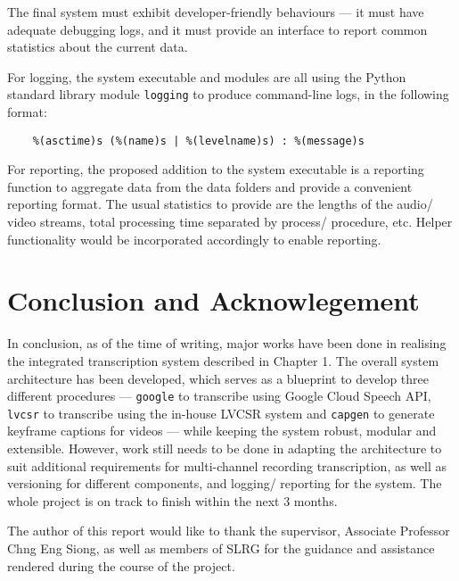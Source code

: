 The final system must exhibit developer-friendly behaviours --- it must have
adequate debugging logs, and it must provide an interface to report common
statistics about the current data.

For logging, the system executable and modules are all using the Python standard
library module \texttt{logging} to produce command-line logs, in the following
format:

\begin{lstlisting}
    %(asctime)s (%(name)s | %(levelname)s) : %(message)s
\end{lstlisting}

For reporting, the proposed addition to the system executable is a reporting
function to aggregate data from the data folders and provide a convenient reporting
format. The usual statistics to provide are the lengths of the audio/ video streams,
total processing time separated by process/ procedure, etc. Helper functionality
would be incorporated accordingly to enable reporting.

\chapter{Conclusion and Acknowlegement}

In conclusion, as of the time of writing, major works have been done in realising
the integrated transcription system described in Chapter 1. The overall system
architecture has been developed, which serves as a blueprint to develop three
different procedures --- \texttt{google} to transcribe using Google Cloud Speech
API, \texttt{lvcsr} to transcribe using the in-house LVCSR system and
\texttt{capgen} to generate keyframe captions for videos --- while keeping the
system robust, modular and extensible. However, work still needs to be done in
adapting the architecture to suit additional requirements for multi-channel
recording transcription, as well as versioning for different components, and
logging/ reporting for the system. The whole project is on track to finish within the next 3 months.

The author of this report would like to thank the supervisor, Associate Professor
Chng Eng Siong, as well as members of SLRG for the guidance and assistance rendered
during the course of the project.